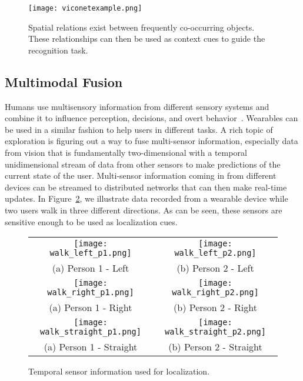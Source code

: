 \begin{figure}[!htb]
\centering
\texttt{[image: viconetexample.png]}
\caption{Spatial relations exist between frequently co-occurring objects. These relationships can then be used as context cues to guide the recognition task.}
\label{fig:viconet}
\end{figure} 

\subsection{Multimodal Fusion}
Humans use multisensory information from different sensory systems and combine it to influence 
perception, decisions, and overt behavior~\cite{stein2009neural}. Wearables can be used in a similar fashion to help users in different tasks. 
A rich topic of exploration is figuring out a way to fuse multi-sensor information, especially data from vision that is fundamentally two-dimensional with a temporal 
unidimensional stream of data from other sensors to make predictions of the current state of the user. Multi-sensor information coming in from different devices can be 
streamed to distributed networks that can then make real-time updates. In Figure~\ref{tab:sensor}, we illustrate data recorded from a wearable device while two users
walk in three different directions. As can be seen, these sensors are sensitive enough to be used as localization cues. 

\begin{figure}[!htb]
\centering
\begin{tabular}{@{}c@{} @{}c@{}}
\vspace{-5pt}
\texttt{[image: walk\_left\_p1.png]} & \texttt{[image: walk\_left\_p2.png]}\\[\abovecaptionskip]
\small(a) Person 1 - Left & \small (b) Person 2 - Left\\
\texttt{[image: walk\_right\_p1.png]} & \texttt{[image: walk\_right\_p2.png]}\\[\abovecaptionskip]
\small(a) Person 1 - Right & \small (b) Person 2 - Right\\
\texttt{[image: walk\_straight\_p1.png]} & \texttt{[image: walk\_straight\_p2.png]}\\[\abovecaptionskip]
\small(a) Person 1 - Straight & \small (b) Person 2 - Straight\\
\end{tabular}
\caption{Temporal sensor information used for localization.}
\label{tab:sensor}
\end{figure}
